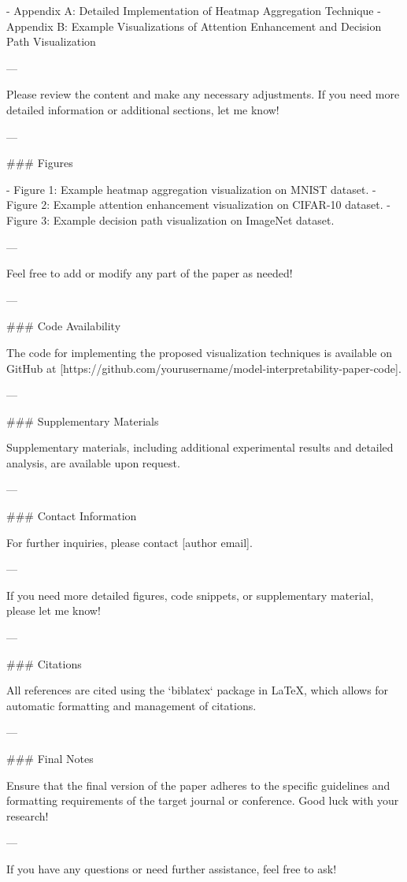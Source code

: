 - Appendix A: Detailed Implementation of Heatmap Aggregation Technique
- Appendix B: Example Visualizations of Attention Enhancement and Decision Path Visualization

---

Please review the content and make any necessary adjustments. If you need more detailed information or additional sections, let me know! 

--- 

### Figures

- Figure 1: Example heatmap aggregation visualization on MNIST dataset.
- Figure 2: Example attention enhancement visualization on CIFAR-10 dataset.
- Figure 3: Example decision path visualization on ImageNet dataset.

---

Feel free to add or modify any part of the paper as needed! 

--- 

### Code Availability

The code for implementing the proposed visualization techniques is available on GitHub at [https://github.com/yourusername/model-interpretability-paper-code].

--- 

### Supplementary Materials

Supplementary materials, including additional experimental results and detailed analysis, are available upon request. 

--- 

### Contact Information

For further inquiries, please contact [author email].

--- 

If you need more detailed figures, code snippets, or supplementary material, please let me know! 

--- 

### Citations

All references are cited using the `biblatex` package in LaTeX, which allows for automatic formatting and management of citations. 

--- 

### Final Notes

Ensure that the final version of the paper adheres to the specific guidelines and formatting requirements of the target journal or conference. Good luck with your research!

--- 

If you have any questions or need further assistance, feel free to ask! 

